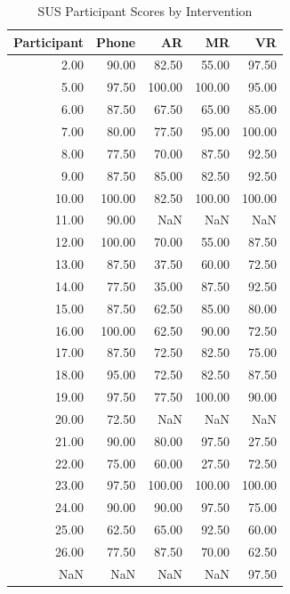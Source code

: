 \begin{table}
\caption{SUS Participant Scores by Intervention}
\begin{tabular}{rrrrr}
\toprule
Participant & Phone & AR & MR & VR \\
\midrule
2.00 & 90.00 & 82.50 & 55.00 & 97.50 \\
5.00 & 97.50 & 100.00 & 100.00 & 95.00 \\
6.00 & 87.50 & 67.50 & 65.00 & 85.00 \\
7.00 & 80.00 & 77.50 & 95.00 & 100.00 \\
8.00 & 77.50 & 70.00 & 87.50 & 92.50 \\
9.00 & 87.50 & 85.00 & 82.50 & 92.50 \\
10.00 & 100.00 & 82.50 & 100.00 & 100.00 \\
11.00 & 90.00 & NaN & NaN & NaN \\
12.00 & 100.00 & 70.00 & 55.00 & 87.50 \\
13.00 & 87.50 & 37.50 & 60.00 & 72.50 \\
14.00 & 77.50 & 35.00 & 87.50 & 92.50 \\
15.00 & 87.50 & 62.50 & 85.00 & 80.00 \\
16.00 & 100.00 & 62.50 & 90.00 & 72.50 \\
17.00 & 87.50 & 72.50 & 82.50 & 75.00 \\
18.00 & 95.00 & 72.50 & 82.50 & 87.50 \\
19.00 & 97.50 & 77.50 & 100.00 & 90.00 \\
20.00 & 72.50 & NaN & NaN & NaN \\
21.00 & 90.00 & 80.00 & 97.50 & 27.50 \\
22.00 & 75.00 & 60.00 & 27.50 & 72.50 \\
23.00 & 97.50 & 100.00 & 100.00 & 100.00 \\
24.00 & 90.00 & 90.00 & 97.50 & 75.00 \\
25.00 & 62.50 & 65.00 & 92.50 & 60.00 \\
26.00 & 77.50 & 87.50 & 70.00 & 62.50 \\
NaN & NaN & NaN & NaN & 97.50 \\
\bottomrule
\end{tabular}
\end{table}
